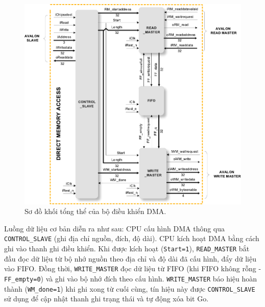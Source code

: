 \begin{figure}[htbp]
    \centering
    \includegraphics[width=\linewidth]{Images/02_09_DMABlockDiagram}
    \caption{Sơ đồ khối tổng thể của bộ điều khiển DMA.}
    \label{fig:02_09_DMA_BlockDiagram}
\end{figure}

Luồng dữ liệu cơ bản diễn ra như sau: CPU cấu hình DMA thông qua \texttt{CONTROL\_SLAVE} (ghi địa chỉ nguồn, đích, độ dài). CPU kích hoạt DMA bằng cách ghi vào thanh ghi điều khiển. Khi được kích hoạt (\texttt{Start=1}), \texttt{READ\_MASTER} bắt đầu đọc dữ liệu từ bộ nhớ nguồn theo địa chỉ và độ dài đã cấu hình, đẩy dữ liệu vào FIFO. Đồng thời, \texttt{WRITE\_MASTER} đọc dữ liệu từ FIFO (khi FIFO không rỗng - \texttt{FF\_empty=0}) và ghi vào bộ nhớ đích theo cấu hình. \texttt{WRITE\_MASTER} báo hiệu hoàn thành (\texttt{WM\_done=1}) khi ghi xong từ cuối cùng, tín hiệu này được \texttt{CONTROL\_SLAVE} sử dụng để cập nhật thanh ghi trạng thái và tự động xóa bit Go.

